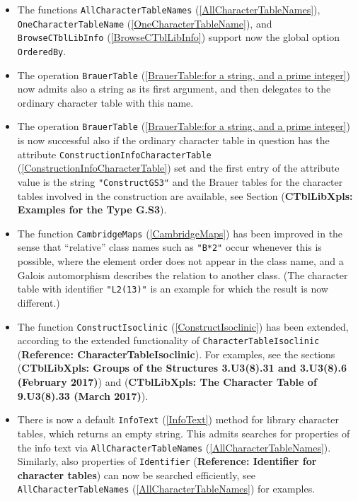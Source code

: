 \documentclass[a4paper,11pt]{report}
\begin{document}
{{{ 
\begin{itemize}
\item  The functions \texttt{AllCharacterTableNames} (\ref{AllCharacterTableNames}), \texttt{OneCharacterTableName} (\ref{OneCharacterTableName}), and \texttt{BrowseCTblLibInfo} (\ref{BrowseCTblLibInfo}) support now the global option \texttt{OrderedBy}. 
\item  The operation \texttt{BrauerTable} (\ref{BrauerTable:for a string, and a prime integer}) now admits also a string as its first argument, and then delegates to the
ordinary character table with this name. 
\item  The operation \texttt{BrauerTable} (\ref{BrauerTable:for a string, and a prime integer}) is now successful also if the ordinary character table in question has the
attribute \texttt{ConstructionInfoCharacterTable} (\ref{ConstructionInfoCharacterTable}) set and the first entry of the attribute value is the string \texttt{"ConstructGS3"} and the Brauer tables for the character tables involved in the construction
are available, see Section  (\textbf{CTblLibXpls: Examples for the Type G.S{\textunderscore}3}). 
\item  The function \texttt{CambridgeMaps} (\ref{CambridgeMaps}) has been improved in the sense that ``relative'' class names such as \texttt{"B*2"} occur whenever this is possible, where the element order does not appear in
the class name, and a Galois automorphism describes the relation to another
class. (The character table with identifier \texttt{"L2(13)"} is an example for which the result is now different.) 
\item  The function \texttt{ConstructIsoclinic} (\ref{ConstructIsoclinic}) has been extended, according to the extended functionality of \texttt{CharacterTableIsoclinic} (\textbf{Reference: CharacterTableIsoclinic}). For examples, see the sections  (\textbf{CTblLibXpls: Groups of the Structures 3.U{\textunderscore}3(8).3{\textunderscore}1 and 3.U{\textunderscore}3(8).6 (February 2017)}) and  (\textbf{CTblLibXpls: The Character Table of 9.U{\textunderscore}3(8).3{\textunderscore}3 (March 2017)}). 
\item  There is now a default \texttt{InfoText} (\ref{InfoText}) method for library character tables, which returns an empty string. This
admits searches for properties of the info text via \texttt{AllCharacterTableNames} (\ref{AllCharacterTableNames}). Similarly, also properties of \texttt{Identifier} (\textbf{Reference: Identifier for character tables}) can now be searched efficiently, see \texttt{AllCharacterTableNames} (\ref{AllCharacterTableNames}) for examples. 

\end{itemize}}}}
\end{document}
